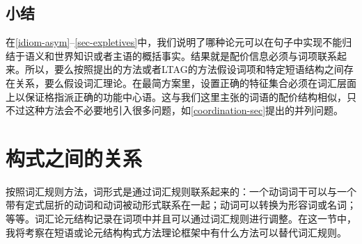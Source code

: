 \begin{exe}
\begin{xlist}[iv.]
\begin{exe}
\begin{xlist}[iv.]
\subsection{小结}
\label{sec-underspec-summary}

在\ref{idiom-asym}--\ref{sec-expletives}中，我们说明了哪种论元可以在句子中实现不能归结于语义和世界知识或者主语的概括事实。结果就是配价信息必须与词项联系起来。所以，要么按照\citeyearpar{Croft2003a}提出的方法或者LTAG的方法假设词项和特定短语结构之间存在关系，要么假设词汇理论。在最简方案里，设置正确的特征集合必须在词汇层面上以保证格指派正确的功能中心语。这与我们这里主张的词语的配价结构相似，只不过这种方法会不必要地引入很多问题，如\ref{coordination-sec}提出的并列问题。

\section{构式之间的关系}
\label{relations-sec}
按照词汇规则方法，词形式是通过词汇规则联系起来的：一个动词词干可以与一个带有定式屈折的动词和动词被动形式联系在一起；动词可以转换为形容词或名词；等等。词汇论元结构记录在词项中并且可以通过词汇规则进行调整。在这一节中，我将考察在短语或论元结构构式方法理论框架中有什么方法可以替代词汇规则。


\end{xlist}
\end{exe}
\end{xlist}
\end{exe}
